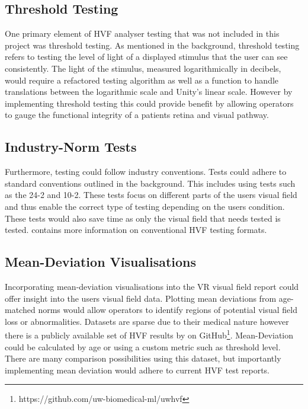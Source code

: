 \documentclass{l4proj}
\begin{document}
\subsection{Threshold Testing}
One primary element of HVF analyser testing that was not included in this project was threshold testing. As mentioned in the background, threshold testing refers to testing the level of light of a displayed stimulus that the user can see consistently. The light of the stimulus, measured logarithmically in decibels, would require a refactored testing algorithm as well as a function to handle translations between the logarithmic scale and Unity's linear scale. However by implementing threshold testing this could provide benefit by allowing operators to gauge the functional integrity of a patients retina and visual pathway.

\subsection{Industry-Norm Tests}
Furthermore, testing could follow industry conventions. Tests could adhere to standard conventions outlined in the background. This includes using tests such as the 24-2 and 10-2. These tests focus on different parts of the users visual field and thus enable the correct type of testing depending on the users condition. These tests would also save time as only the visual field that needs tested is tested. \citet{RuiaTripathy2021HVF} contains more information on conventional HVF testing formats.
\subsection{Mean-Deviation Visualisations}
Incorporating mean-deviation visualisations into the VR visual field report could offer insight into the users visual field data. Plotting mean deviations from age-matched norms would allow operators to identify regions of potential visual field loss or abnormalities. Datasets are sparse due to their medical nature however there is a publicly available set of HVF results by \cite{montesano2022uwhvf} on GitHub\footnote{https://github.com/uw-biomedical-ml/uwhvf}. Mean-Deviation could be calculated by age or using a custom metric such as threshold level. There are many comparison possibilities using this dataset, but importantly implementing mean deviation would adhere to current HVF test reports.


%
% 
\end{document}
